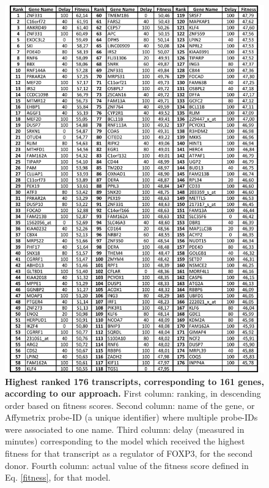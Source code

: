 \documentclass[oneside, 10pt, a4paper, twocolumn]{article}
\begin{document}
{\renewcommand{\figurename}{Table}
\renewcommand{\thefigure}{S1}
\begin{figure}[ht!]
\centering
  \includegraphics[scale=0.6]{Fig3SM.pdf}
  \caption{\textbf{Highest ranked 176 transcripts, corresponding to 161 genes, according to our approach.} First column: ranking, in descending order based on fitness scores. Second column: name of the gene, or Affymetrix probe-ID (a unique identifier) where multiple probe-IDs were associated to one name. Third column: delay (measured in minutes) corresponding to the model which received the highest fitness for that transcript as a regulator of FOXP3, for the second donor. Fourth column: actual value of the fitness score defined in Eq. \eqref{fitness}, for that model.
}
  \label{SupTabComputational}
\end{figure}

\clearpage



}
\end{document}
